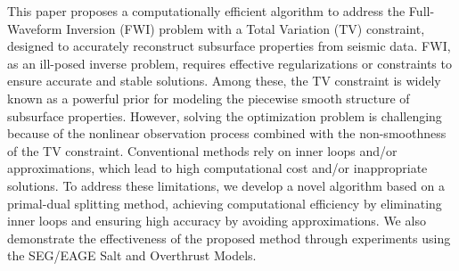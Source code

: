 This paper proposes a computationally efficient algorithm to address the Full-Waveform Inversion (FWI) problem with a Total Variation (TV) constraint, designed to accurately reconstruct subsurface properties from seismic data.
FWI, as an ill-posed inverse problem, requires effective regularizations or constraints to ensure accurate and stable solutions.
Among these, the TV constraint is widely known as a powerful prior for modeling the piecewise smooth structure of subsurface properties.
However, solving the optimization problem is challenging because of the nonlinear observation process combined with the non-smoothness of the TV constraint.
Conventional methods rely on inner loops and/or approximations, which lead to high computational cost and/or inappropriate solutions.
To address these limitations, we develop a novel algorithm based on a primal-dual splitting method, achieving computational efficiency by eliminating inner loops and ensuring high accuracy by avoiding approximations.
We also demonstrate the effectiveness of the proposed method through experiments using the SEG/EAGE Salt and Overthrust Models.

